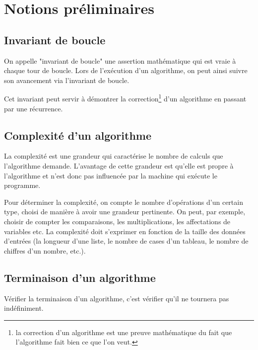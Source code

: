 \section{Notions préliminaires}
	
	\subsection{Invariant de boucle}
		
		On appelle "invariant de boucle" une assertion mathématique qui est vraie à chaque tour de boucle. Lors de l'exécution d'un algorithme, on peut ainsi suivre son avancement via l'invariant de boucle.
		
		Cet invariant peut servir à démontrer la correction\footnote{la correction d'un algorithme est une preuve mathématique du fait que l'algorithme fait bien ce que l'on veut.} d'un algorithme en passant par une récurrence.
	
	\subsection{Complexité d'un algorithme}
		
		La complexité est une grandeur qui caractérise le nombre de calculs que l'algorithme demande. L'avantage de cette grandeur est qu'elle est propre à l'algorithme et n'est donc pas influencée par la machine qui exécute le programme.
		
		Pour déterminer la complexité, on compte le nombre d'opérations d'un certain type, choisi de manière à avoir une grandeur pertinente. On peut, par exemple, choisir de compter les comparaisons, les multiplications, les affectations de variables etc. La complexité doit s'exprimer en fonction de la taille des données d'entrées (la longueur d'une liste, le nombre de cases d'un tableau, le nombre de chiffres d'un nombre, etc.).

	\subsection{Terminaison d'un algorithme}
		
		Vérifier la terminaison d'un algorithme, c'est vérifier qu'il ne tournera pas indéfiniment.
		
